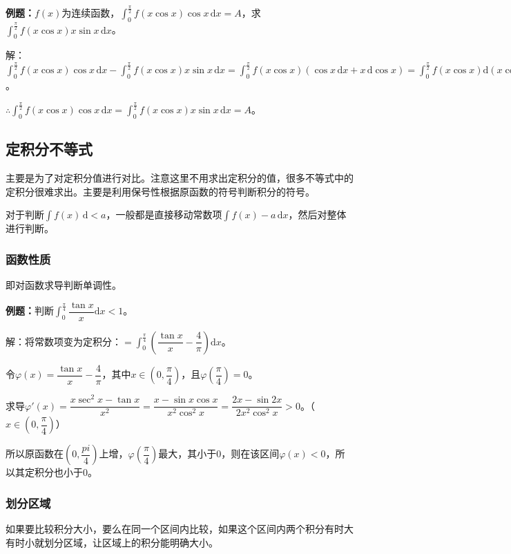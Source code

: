 \documentclass[UTF8, 12pt]{ctexart}
\begin{document}
\textbf{例题：}$f(x)$为连续函数，$\int_0^\frac{\pi}{2}f(x\cos x)\cos x\,\textrm{d}x=A$，求$\int_0^\frac{\pi}{2}f(x\cos x)x\sin x\,\textrm{d}x$。

解：$\int_0^\frac{\pi}{2}f(x\cos x)\cos x\,\textrm{d}x-\int_0^\frac{\pi}{2}f(x\cos x)x\sin x\,\textrm{d}x=\int_0^\frac{\pi}{2}f(x\cos x)(\cos x\,\textrm{d}x+x\,\textrm{d}\cos x)=\int_0^\frac{\pi}{2}f(x\cos x)\textrm{d}(x\cos x)=F(x\cos x)\vert_0^\frac{\pi}{2}=F(0)-F(0)=0$。

$\therefore\int_0^\frac{\pi}{2}f(x\cos x)\cos x\,\textrm{d}x=\int_0^\frac{\pi}{2}f(x\cos x)x\sin x\,\textrm{d}x=A$。

\subsection{定积分不等式}

主要是为了对定积分值进行对比。注意这里不用求出定积分的值，很多不等式中的定积分很难求出。主要是利用保号性根据原函数的符号判断积分的符号。

对于判断$\int f(x)\,\textrm{d}<a$，一般都是直接移动常数项$\int f(x)-a\,\textrm{d}x$，然后对整体进行判断。

\subsubsection{函数性质}

即对函数求导判断单调性。

\textbf{例题：}判断$\displaystyle{\int_0^\frac{\pi}{4}\dfrac{\tan x}{x}\textrm{d}x<1}$。

解：将常数项变为定积分：$=\displaystyle{\int_0^\frac{\pi}{4}\left(\dfrac{\tan x}{x}-\dfrac{4}{\pi}\right)\textrm{d}x}$。

令$\varphi(x)=\dfrac{\tan x}{x}-\dfrac{4}{\pi}$，其中$x\in\left(0,\dfrac{\pi}{4}\right)$，且$\varphi\left(\dfrac{\pi}{4}\right)=0$。

求导$\varphi'(x)=\dfrac{x\sec^2x-\tan x}{x^2}=\dfrac{x-\sin x\cos x}{x^2\cos^2x}=\dfrac{2x-\sin 2x}{2x^2\cos^2x}>0$。（$x\in\left(0,\dfrac{\pi}{4}\right)$）

所以原函数在$\left(0,\dfrac{pi}{4}\right)$上增，$\varphi\left(\dfrac{\pi}{4}\right)$最大，其小于0，则在该区间$\varphi(x)<0$，所以其定积分也小于0。

\subsubsection{划分区域}

如果要比较积分大小，要么在同一个区间内比较，如果这个区间内两个积分有时大有时小就划分区域，让区域上的积分能明确大小。
\end{document}

